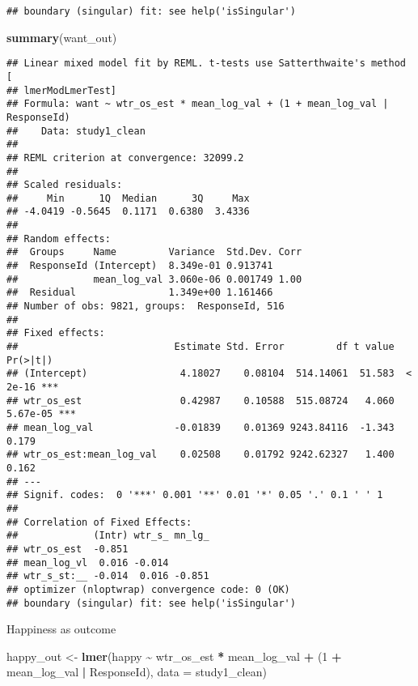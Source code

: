 \documentclass[
]{article}
\newenvironment{Shaded}{\begin{snugshade}}{\end{snugshade}}
\newcommand{\AttributeTok}[1]{\textcolor[rgb]{0.13,0.29,0.53}{#1}}
\newcommand{\DecValTok}[1]{\textcolor[rgb]{0.00,0.00,0.81}{#1}}
\newcommand{\FunctionTok}[1]{\textcolor[rgb]{0.13,0.29,0.53}{\textbf{#1}}}
\newcommand{\NormalTok}[1]{#1}
\newcommand{\OtherTok}[1]{\textcolor[rgb]{0.56,0.35,0.01}{#1}}
\newcommand{\SpecialCharTok}[1]{\textcolor[rgb]{0.81,0.36,0.00}{\textbf{#1}}}
\begin{document}
\begin{verbatim}
## boundary (singular) fit: see help('isSingular')
\end{verbatim}

\begin{Shaded}
\begin{Highlighting}[]
\FunctionTok{summary}\NormalTok{(want\_out)}
\end{Highlighting}
\end{Shaded}

\begin{verbatim}
## Linear mixed model fit by REML. t-tests use Satterthwaite's method [
## lmerModLmerTest]
## Formula: want ~ wtr_os_est * mean_log_val + (1 + mean_log_val | ResponseId)
##    Data: study1_clean
## 
## REML criterion at convergence: 32099.2
## 
## Scaled residuals: 
##     Min      1Q  Median      3Q     Max 
## -4.0419 -0.5645  0.1171  0.6380  3.4336 
## 
## Random effects:
##  Groups     Name         Variance  Std.Dev. Corr
##  ResponseId (Intercept)  8.349e-01 0.913741     
##             mean_log_val 3.060e-06 0.001749 1.00
##  Residual                1.349e+00 1.161466     
## Number of obs: 9821, groups:  ResponseId, 516
## 
## Fixed effects:
##                           Estimate Std. Error         df t value Pr(>|t|)    
## (Intercept)                4.18027    0.08104  514.14061  51.583  < 2e-16 ***
## wtr_os_est                 0.42987    0.10588  515.08724   4.060 5.67e-05 ***
## mean_log_val              -0.01839    0.01369 9243.84116  -1.343    0.179    
## wtr_os_est:mean_log_val    0.02508    0.01792 9242.62327   1.400    0.162    
## ---
## Signif. codes:  0 '***' 0.001 '**' 0.01 '*' 0.05 '.' 0.1 ' ' 1
## 
## Correlation of Fixed Effects:
##             (Intr) wtr_s_ mn_lg_
## wtr_os_est  -0.851              
## mean_log_vl  0.016 -0.014       
## wtr_s_st:__ -0.014  0.016 -0.851
## optimizer (nloptwrap) convergence code: 0 (OK)
## boundary (singular) fit: see help('isSingular')
\end{verbatim}

Happiness as outcome

\begin{Shaded}
\begin{Highlighting}[]
\NormalTok{happy\_out }\OtherTok{\textless{}{-}} \FunctionTok{lmer}\NormalTok{(happy }\SpecialCharTok{\textasciitilde{}}\NormalTok{ wtr\_os\_est }\SpecialCharTok{*}\NormalTok{ mean\_log\_val }\SpecialCharTok{+}\NormalTok{ (}\DecValTok{1} \SpecialCharTok{+}\NormalTok{ mean\_log\_val }\SpecialCharTok{|}\NormalTok{ ResponseId), }\AttributeTok{data =}\NormalTok{ study1\_clean)}
\end{Highlighting}
\end{Shaded}
\end{document}
